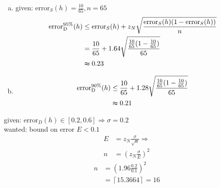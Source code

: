 \documentclass[10pt,a4paper,boxed]{hmcpset}
\begin{document}
	
		\begin{problem}
		\end{problem}

		\begin{solution}		
			\begin{enumerate}[(a)]
				\item given: $\textrm{error}_S(h) = \frac{10}{65}, n=65$
					\begin{align*}
						\textrm{error}_{\textrm{D}}^{95\%}(h) & \leq \textrm{error}_S(h) + z_N \sqrt{\frac{\textrm{error}_S(h)(1-\textrm{error}_S(h))}{n}}\\
															  & = \frac{10}{65} + 1.64 \sqrt{\frac{\frac{10}{65}(1-\frac{10}{65})}{65}}\\
															  & \thickapprox 0.23
					\end{align*}
					
				\item 
					\begin{align*}
						\textrm{error}_{\textrm{D}}^{90\%}(h) & \leq \frac{10}{65} + 1.28 					\sqrt{\frac{\frac{10}{65}(1-\frac{10}{65})}{65}}\\
															  & \thickapprox 0.21
					\end{align*}
									 			
			\end{enumerate}
			
		\end{solution}		

		\begin{problem}
		\end{problem}
		\begin{solution}
			given: $\textrm{error}_D(h) \in [0.2, 0.6] \Rightarrow \sigma = 0.2$\\
			wanted: bound on error $E<0.1$
			\begin{align*}
				E & = z_N \frac{\sigma}{\sqrt{n}} \Rightarrow \\
				n & = \left( z_N \frac{\sigma}{E} \right)^2
			\end{align*}
			\begin{align*}
				n & = \left( 1.96 \frac{0.2}{0.1} \right)^2 \\
				  & = \left\lceil 15.3664 \right\rceil = 16
			\end{align*}
		\end{solution}
		
		\begin{problem}[4. AUC]
				\end{problem}
		
\end{document}

